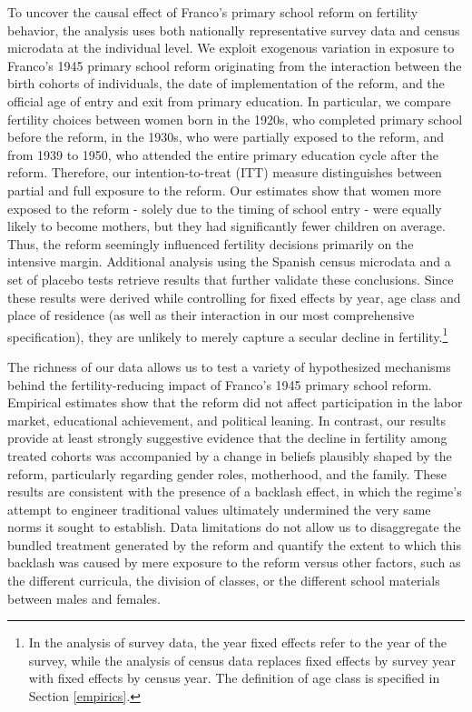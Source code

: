 \documentclass[a4paper,oneside,final,onecolumn,12pt,english]{article}
\begin{document}
To uncover the causal effect of Franco's primary school reform on fertility behavior, the analysis uses both nationally representative survey data and census microdata at the individual level. We exploit exogenous variation in exposure to Franco’s 1945 primary school reform originating from the interaction between the birth cohorts of individuals, the date of implementation of the reform, and the official age of entry and exit from primary education. In particular, we compare fertility choices between women born in the 1920s, who completed primary school before the reform, in the 1930s, who were partially exposed to the reform, and from 1939 to 1950, who attended the entire primary education cycle after the reform. Therefore, our intention-to-treat (ITT) measure distinguishes between partial and full exposure to the reform. Our  estimates show that women more exposed to the reform - solely due to the timing of school entry - were equally likely to become mothers, but they had significantly fewer children on average. Thus, the reform seemingly influenced fertility decisions primarily on the intensive margin. Additional analysis %
using the Spanish census microdata and a set of placebo tests retrieve results that further validate these conclusions. Since these results were derived while controlling for fixed effects by year, age class and place of residence (as well as their interaction in our most comprehensive specification), they are unlikely to merely capture a secular decline in fertility.\footnote{In the analysis of survey data, the year fixed effects refer to the year of the survey, while the analysis of census data replaces fixed effects by survey year with fixed effects by census year. The definition of age class is specified in  Section \ref{empirics}.}

The richness of our data allows us to test a variety of hypothesized mechanisms behind the fertility-reducing impact of Franco’s 1945 primary school reform. Empirical estimates show that the reform did not affect participation in the labor market, educational achievement, and political leaning. In contrast, our results provide at least strongly suggestive evidence that the decline in fertility among treated cohorts was accompanied by a change in beliefs plausibly shaped by the reform, particularly regarding gender roles, motherhood, and the family. These results are consistent with the presence of a backlash effect, in which the regime's attempt to engineer traditional values ultimately undermined the very same norms it sought to establish. Data limitations do not allow us to disaggregate the bundled treatment generated by the reform and quantify the extent to which this backlash was caused by mere exposure to the reform versus other factors, such as the different curricula, the division of classes, or the different school materials between males and females. 
\end{document}
